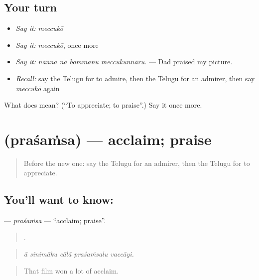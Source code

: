 \subsection*{Your turn}
\begin{itemize}
\raggedright
  \item \emph{Say it:} \emph{meccukō}
  \item \emph{Say it:} \emph{meccukō}, once more
  \item \emph{Say it:} \emph{nānna nā bommanu meccukunnāru.} — Dad praised my picture.
  \item \emph{Recall:} say the Telugu for to admire, then the Telugu for an admirer, then say \emph{meccukō} again
\end{itemize}

\begin{tcolorbox}[breakable,colback=teal!4,colframe=teal!35!black,title={Before you move on}]
What does  mean? (\textquotedblleft{}To appreciate; to praise\textquotedblright{}.) Say it once more.
\end{tcolorbox}
\section[\texorpdfstring{\te{ప్రశంస} (praśaṁsa)}{ప్రశంస (praśaṁsa)}]{ (praśaṁsa) — acclaim; praise}

\label{lesson:TE-C504-prasamsa}



\begin{quote}
Before the new one: say the Telugu for an admirer, then the Telugu for to appreciate.
\end{quote}

\subsection*{You'll want to know: }
\textbf{} — \emph{praśaṁsa} — \textquotedblleft{}acclaim; praise\textquotedblright{}.

\begin{quote}
    .
\end{quote}

\begin{quote}
\emph{ā sinimāku cālā praśaṁsalu vaccāyi.}
\end{quote}

\begin{quote}
That film won a lot of acclaim.
\end{quote}

